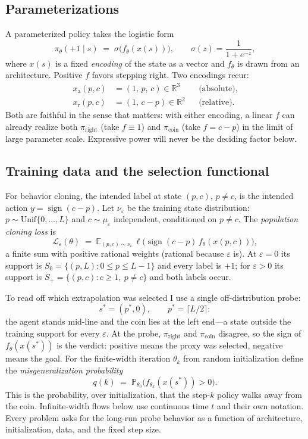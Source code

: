 \documentclass[11pt]{amsart}
\theoremstyle{plain}
\theoremstyle{definition}
\begin{document}
\subsection{Parameterizations}\label{subsec:param}
A parameterized policy takes the logistic form
\[
   \pi_\theta(+1\mid s)\;=\;\sigma\bigl(f_\theta(x(s))\bigr),
   \qquad \sigma(z)=\frac{1}{1+e^{-z}},
\]
where $x(s)$ is a fixed \emph{encoding} of the state as a vector and $f_\theta$ is drawn from an architecture. Positive $f$ favors stepping right. Two encodings recur:
\[
   \begin{aligned}
   x_{\mathrm a}(p,c)&=(1,\,p,\,c)\in\mathbb R^3
      &&\text{(absolute)},\\
   x_{\mathrm r}(p,c)&=(1,\,c-p)\in\mathbb R^2
      &&\text{(relative)}.
   \end{aligned}
\]
Both are faithful in the sense that matters: with either encoding, a linear $f$ can already realize both $\pi_{\mathrm{right}}$ (take $f\equiv1$) and $\pi_{\mathrm{coin}}$ (take $f=c-p$) in the limit of large parameter scale. Expressive power will never be the deciding factor below.

\subsection{Training data and the selection functional}\label{subsec:selection}
For behavior cloning, the intended label at state $(p,c)$, $p\ne c$, is the intended action $y=\operatorname{sign}(c-p)$. Let $\nu_\varepsilon$ be the training state distribution: $p\sim\mathrm{Unif}\{0,\dots,L\}$ and $c\sim\mu_\varepsilon$ independent, conditioned on $p\ne c$. The \emph{population cloning loss} is
\[
   \mathcal L_\varepsilon(\theta)\;=\;\mathbb E_{(p,c)\sim\nu_\varepsilon}\,
   \ell\bigl(\operatorname{sign}(c-p)\, f_\theta(x(p,c))\bigr),
\]
a finite sum with positive rational weights (rational because $\varepsilon$ is). At $\varepsilon=0$ its support is $S_0=\{(p,L):0\le p\le L-1\}$ and every label is $+1$; for $\varepsilon>0$ its support is $S_+=\{(p,c): c\ge1,\ p\ne c\}$ and both labels occur.

To read off which extrapolation was selected I use a single off-distribution probe:
\[
   s^{*}=(p^{*},0),\qquad p^{*}=\lceil L/2\rceil:
\]
the agent stands mid-line and the coin lies at the left end---a state outside the training support for every $\varepsilon$. At the probe, $\pi_{\mathrm{right}}$ and $\pi_{\mathrm{coin}}$ disagree, so the sign of $f_\theta(x(s^{*}))$ is the verdict: positive means the proxy was selected, negative means the goal. For the finite-width iteration $\theta_k$ from random initialization define the \emph{misgeneralization probability}
\begin{equation}\label{eq:selection}
   q(k)\;=\;\mathbb P_{\theta_0}\bigl(f_{\theta_k}(x(s^{*}))>0\bigr).
\end{equation}
This is the probability, over initialization, that the step-$k$ policy walks away from the coin. Infinite-width flows below use continuous time $t$ and their own notation. Every problem asks for the long-run probe behavior as a function of architecture, initialization, data, and the fixed step size.
\end{document}
